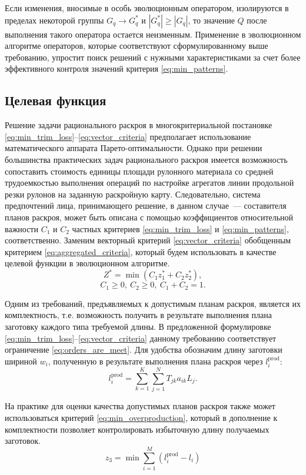 \documentclass[12pt]{article}
\begin{document}
Если изменения, вносимые в особь эволюционным оператором, изолируются в 
пределах некоторой группы $G_q \rightarrow G_q^*$ и $|G_q^*| \geq |G_q|$, то 
значение $Q$ после выполнения такого оператора остается неизменным. Применение 
в эволюционном алгоритме операторов, которые соответствуют сформулированному 
выше требованию, упростит поиск решений с нужными характеристиками за счет 
более эффективного контроля значений критерия 
\eqref{eq:min_patterns}.

\subsection{Целевая функция}

Решение задачи рационального раскроя в многокритериальной постановке 
\eqref{eq:min_trim_loss}--\eqref{eq:vector_criteria}
предполагает использование математического аппарата Парето-оптимальности. 
Однако при решении большинства практических задач рационального раскроя 
имеется возможность сопоставить стоимость единицы площади рулонного материала 
со средней трудоемкостью выполнения операций по настройке агрегатов линии 
продольной резки рулонов на заданную раскройную карту. Следовательно, система 
предпочтений лица, принимающего решение, в данном случае~--- составителя планов 
раскроя, может быть описана с помощью коэффициентов относительной важности 
$C_1$ и $C_2$ частных критериев 
\eqref{eq:min_trim_loss} и 
\eqref{eq:min_patterns}, 
соответственно. Заменим векторный 
критерий 
\eqref{eq:vector_criteria}
обобщенным критерием 
\eqref{eq:aggregated_criteria}, 
который будем использовать в качестве 
целевой функции в эволюционном алгоритме.
\begin{equation}\label{eq:aggregated_criteria}
    Z^*=\min{(C_1z_1^*+C_2z_2^*)},
\end{equation}
\[C_1 \geq 0, \: C_2 \geq 0, \: C_1+C_2=1.\]

Одним из требований, предъявляемых к допустимым планам раскроя, является их 
комплектность, т.е. возможность получить в результате выполнения плана 
заготовку каждого типа требуемой длины. В предложенной формулировке 
\eqref{eq:min_trim_loss}--\eqref{eq:vector_criteria}
данному требованию соответствует ограничение 
\eqref{eq:orders_are_meet}. 
Для удобства обозначим длину 
заготовки шириной $w_i$, полученную в результате выполнения плана раскроя 
через $l_i^{\text{prod}}$:
\[ l_i^{\text{prod}}=\sum_{k=1}^{K} \sum_{j=1}^{N} T_{jk}a_{ik}L_j. \]

На практике для оценки качества допустимых планов раскроя также может 
использоваться критерий 
\eqref{eq:min_overproduction}, 
который в дополнение к комплектности позволяет 
контролировать избыточную длину получаемых заготовок.
\begin{equation}\label{eq:min_overproduction}
    z_3=\min{\sum_{i=1}^{M} \left( l_i^{\text{prod}}-l_i \right)}
\end{equation}
\end{document}
